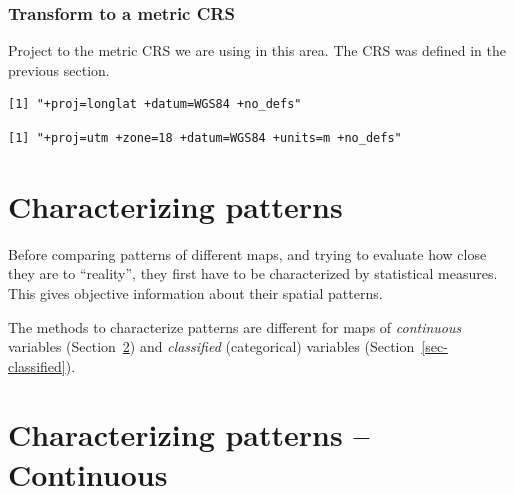 \documentclass[
  letterpaper,
  DIV=11,
  numbers=noendperiod]{scrartcl}
\newenvironment{Shaded}{\begin{snugshade}}{\end{snugshade}}
\newcommand{\FunctionTok}[1]{\textcolor[rgb]{0.28,0.35,0.67}{#1}}
\newcommand{\NormalTok}[1]{\textcolor[rgb]{0.00,0.23,0.31}{#1}}
\newcommand{\OtherTok}[1]{\textcolor[rgb]{0.00,0.23,0.31}{#1}}
\newcommand{\SpecialCharTok}[1]{\textcolor[rgb]{0.37,0.37,0.37}{#1}}
\begin{document}
\hypertarget{transform-to-a-metric-crs-1}{%
\subsubsection{Transform to a metric
CRS}\label{transform-to-a-metric-crs-1}}

Project to the metric CRS we are using in this area. The CRS was defined
in the previous section.

\begin{Shaded}
\end{Shaded}

\begin{verbatim}
[1] "+proj=longlat +datum=WGS84 +no_defs"
\end{verbatim}

\begin{Shaded}
\end{Shaded}

\begin{verbatim}
[1] "+proj=utm +zone=18 +datum=WGS84 +units=m +no_defs"
\end{verbatim}

\hypertarget{characterizing-patterns}{%
\section{Characterizing patterns}\label{characterizing-patterns}}

Before comparing patterns of different maps, and trying to evaluate how
close they are to ``reality'', they first have to be characterized by
statistical measures. This gives objective information about their
spatial patterns.

The methods to characterize patterns are different for maps of
\emph{continuous} variables (Section~\ref{sec-continuous}) and
\emph{classified} (categorical) variables
(Section~\ref{sec-classified}).

\hypertarget{sec-continuous}{%
\section{Characterizing patterns -- Continuous}\label{sec-continuous}}
\end{document}
